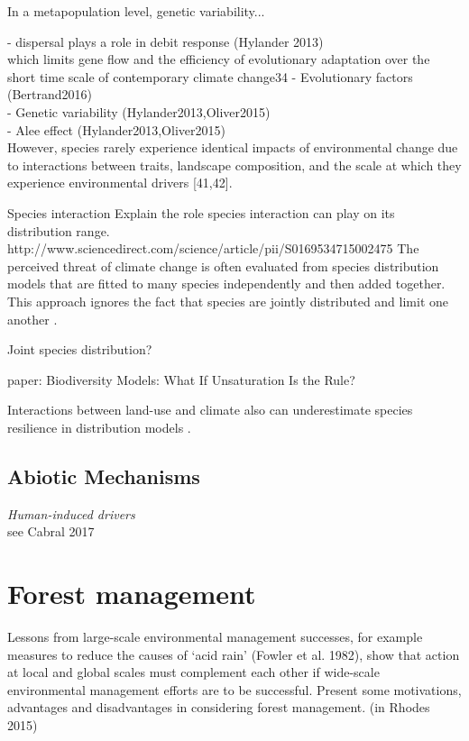 In a metapopulation level, genetic variability...

- dispersal plays a role in debit response (Hylander 2013)\\ which limits gene flow and the efficiency of evolutionary adaptation over the short time scale of contemporary climate change34
- Evolutionary factors (Bertrand2016)\\
- Genetic variability (Hylander2013,Oliver2015)\\
- Alee effect (Hylander2013,Oliver2015)\\

However, species rarely experience identical impacts of environmental change due to interactions between traits, landscape composition, and the scale at which they experience environmental drivers [41,42].

Species interaction
Explain the role species interaction can play on its distribution range. \\
http://www.sciencedirect.com/science/article/pii/S0169534715002475
The perceived threat of climate change is often evaluated from species distribution models that are fitted to many species independently and then added together. This approach ignores the fact that species are jointly distributed and limit one another \citep{clark2014}.

Joint species distribution?

paper: Biodiversity Models: What If Unsaturation Is the Rule?

Interactions between land-use and climate also can underestimate species resilience in distribution models \citep{Goring2017}.

\subsection{Abiotic Mechanisms}

\textit{Human-induced drivers} \\
see Cabral 2017

\section{Forest management}

Lessons from large-scale environmental management successes, for example measures to reduce the causes of ‘acid rain’ (Fowler et al. 1982), show that action at local and global scales must complement each other if wide-scale environmental management efforts are to be successful.
Present some motivations, advantages and disadvantages in considering forest management. (in Rhodes 2015)

